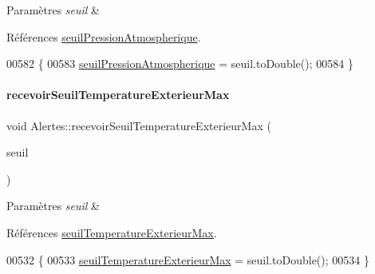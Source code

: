 \begin{DoxyParams}{Paramètres}
{\em seuil} & \\
\hline
\end{DoxyParams}


Références \hyperlink{class_alertes_a565094789ef5eb0ae2a2a562ee8a9704}{seuil\+Pression\+Atmospherique}.


\begin{DoxyCode}
00582 \{
00583     \hyperlink{class_alertes_a565094789ef5eb0ae2a2a562ee8a9704}{seuilPressionAtmospherique} = seuil.toDouble();
00584 \}
\end{DoxyCode}
\mbox{\label{class_alertes_af896e03da2f2ec319d410fb8dcc89e0e}} 
\paragraph{\texorpdfstring{recevoir\+Seuil\+Temperature\+Exterieur\+Max}{recevoirSeuilTemperatureExterieurMax}}
{\footnotesize\ttfamily void Alertes\+::recevoir\+Seuil\+Temperature\+Exterieur\+Max (\begin{DoxyParamCaption}\item[{Q\+String}]{seuil }\end{DoxyParamCaption})\hspace{0.3cm}{\ttfamily [slot]}}


\begin{DoxyParams}{Paramètres}
{\em seuil} & \\
\hline
\end{DoxyParams}


Références \hyperlink{class_alertes_a207e0266c68ad378dae846382ba9f9dc}{seuil\+Temperature\+Exterieur\+Max}.


\begin{DoxyCode}
00532 \{
00533     \hyperlink{class_alertes_a207e0266c68ad378dae846382ba9f9dc}{seuilTemperatureExterieurMax} = seuil.toDouble();
00534 \}
\end{DoxyCode}
\mbox{\label{class_alertes_ad88c760d06e1d438a57027857d50a77f}} 
